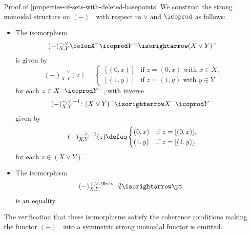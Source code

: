 \begin{Proof}{Proof of \cref{properties-of-sets-with-deleted-basepoints}}
    We construct the strong monoidal structure on $(-)^{-}$ with respect to $\vee$ and $\icoprod$ as follows:
    \begin{itemize}
        \item{}The isomorphism
            \[
                (-)^{-,\vee}_{X,Y}%
                \colon%
                X^{-}\icoprod Y^{-}%
                \isorightarrow
                (X\vee Y)^{-}
            \]%
            is given by
            \[
                (-)^{-,\vee}_{X,Y}(z)%
                =%
                \begin{cases}%
                    [(0,x)] &\text{if $z=(0,x)$ with $x\in X$,}\\%
                    [(1,y)] &\text{if $z=(1,y)$ with $y\in Y$}%
                \end{cases}%
            \]%
            for each $z\in X^{-}\icoprod Y^{-}$, with inverse
            \[
                (-)^{-,\vee,-1}_{X,Y}
                \colon%
                (X\vee Y)^{-}
                \isorightarrow
                X^{-}\icoprod Y^{-}%
            \]%
            given by
            \[
                (-)^{-,\vee,-1}_{X,Y}(z)%
                \defeq%
                \begin{cases}
                    (0,x) &\text{if $z=[(0,x)]$,}\\
                    (1,y) &\text{if $z=[(1,y)]$,}
                \end{cases}
            \]%
            for each $z\in(X\vee Y)^{-}$.
        \item{}The isomorphism
            \[
                (-)^{+,\vee,\Unit}_{X,Y}%
                \colon%
                \emptyset%
                \isorightarrow
                \pt^{-}%
            \]%
            is an equality.
    \end{itemize}
    The verification that these isomorphisms satisfy the coherence conditions making the functor $(-)^{-}$ into a symmetric strong monoidal functor is omitted.


\end{Proof}

